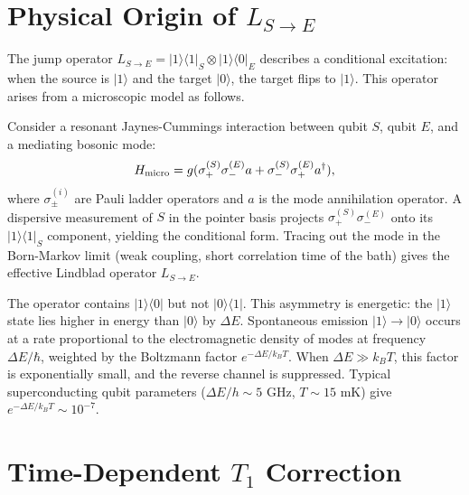 \documentclass[aps,pra,onecolumn]{revtex4-2}
\begin{document}
\section{Physical Origin of $L_{S\to E}$}

The jump operator $L_{S\to E}=|1\rangle\langle 1|_S\otimes|1\rangle\langle 0|_E$ describes a conditional excitation: when the source is $|1\rangle$ and the target $|0\rangle$, the target flips to $|1\rangle$. This operator arises from a microscopic model as follows.

Consider a resonant Jaynes-Cummings interaction between qubit $S$, qubit $E$, and a mediating bosonic mode:
\begin{equation}
H_{\rm micro} = g(\sigma_+^{(S)}\sigma_-^{(E)}a + \sigma_-^{(S)}\sigma_+^{(E)}a^\dagger),
\end{equation}
where $\sigma_\pm^{(i)}$ are Pauli ladder operators and $a$ is the mode annihilation operator. A dispersive measurement of $S$ in the pointer basis projects $\sigma_+^{(S)}\sigma_-^{(E)}$ onto its $|1\rangle\langle 1|_S$ component, yielding the conditional form. Tracing out the mode in the Born-Markov limit (weak coupling, short correlation time of the bath) gives the effective Lindblad operator $L_{S\to E}$.

The operator contains $|1\rangle\langle 0|$ but not $|0\rangle\langle 1|$. This asymmetry is energetic: the $|1\rangle$ state lies higher in energy than $|0\rangle$ by $\Delta E$. Spontaneous emission $|1\rangle \to |0\rangle$ occurs at a rate proportional to the electromagnetic density of modes at frequency $\Delta E/\hbar$, weighted by the Boltzmann factor $e^{-\Delta E/k_B T}$. When $\Delta E \gg k_B T$, this factor is exponentially small, and the reverse channel is suppressed. Typical superconducting qubit parameters ($\Delta E/h \sim 5$ GHz, $T \sim 15$ mK) give $e^{-\Delta E/k_B T} \sim 10^{-7}$.

\section{Time-Dependent $T_1$ Correction}
\end{document}
